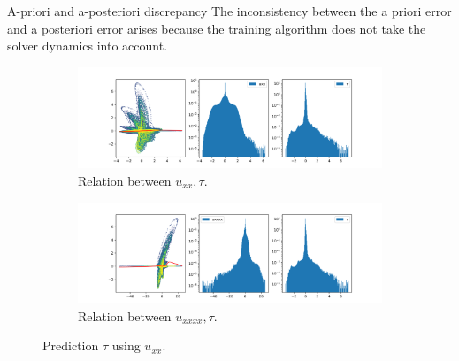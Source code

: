 \documentclass[paper slide]{beamer}
\begin{document}
\begin{frame}{A-priori and a-posteriori discrepancy}
	The inconsistency between the a priori error and a posteriori error arises because the {\color{red}training algorithm does not take the solver dynamics into account}.
	\begin{figure}[ht]
		\centering
		\begin{subfigure}[b]{\textwidth}
			\centering
			\includegraphics[width=.8\textwidth]
			{fig/regression_uxx_tau_err_scatter.png}
			\caption{Relation between $u_{xx}, \tau$.} 
		\end{subfigure}
		\begin{subfigure}[b]{\textwidth}
			\centering
			\includegraphics[width=.8\textwidth]
			{fig/regression_uxxxx_tau_err_scatter.png}
			\caption{Relation between $u_{xxxx}, \tau$.} 
		\end{subfigure}
		\caption{Prediction $\tau$ using $u_{xx}$.}
		\label{fig:cmp_stats1}
	\end{figure}
\end{frame}
\end{document}
